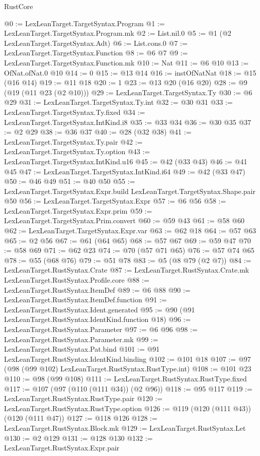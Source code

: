 \begin{lexlean}{RustCore}
\begin{coremodule}
{\begin{coremodule}
{{{{{@0 := LexLeanTarget.TargetSyntax.Program
@1 := LexLeanTarget.TargetSyntax.Program.mk
@2 := List.nil.{0}
@5 := @1 (@2 LexLeanTarget.TargetSyntax.Adt)
@6 := List.cons.{0}
@7 := LexLeanTarget.TargetSyntax.Function
@8 := @6 @7
@9 := LexLeanTarget.TargetSyntax.Function.mk
@10 := Nat
@11 := @6 @10
@13 := OfNat.ofNat.{0} @10
@14 := 0
@15 := @13 @14
@16 := instOfNatNat
@18 := @15 (@16 @14)
@19 := @11 @18
@20 := 1
@23 := @13 @20 (@16 @20)
@28 := @9 (@19 (@11 @23 (@2 @10)))
@29 := LexLeanTarget.TargetSyntax.Ty
@30 := @6 @29
@31 := LexLeanTarget.TargetSyntax.Ty.int
@32 := @30 @31
@33 := LexLeanTarget.TargetSyntax.Ty.fixed
@34 := LexLeanTarget.TargetSyntax.IntKind.i8
@35 := @33 @34
@36 := @30 @35
@37 := @2 @29
@38 := @36 @37
@40 := @28 (@32 @38)
@41 := LexLeanTarget.TargetSyntax.Ty.pair
@42 := LexLeanTarget.TargetSyntax.Ty.option
@43 := LexLeanTarget.TargetSyntax.IntKind.u16
@45 := @42 (@33 @43)
@46 := @41 @45
@47 := LexLeanTarget.TargetSyntax.IntKind.i64
@49 := @42 (@33 @47)
@50 := @46 @49
@51 := @40 @50
@55 := LexLeanTarget.TargetSyntax.Expr.build LexLeanTarget.TargetSyntax.Shape.pair @50
@56 := LexLeanTarget.TargetSyntax.Expr
@57 := @6 @56
@58 := LexLeanTarget.TargetSyntax.Expr.prim
@59 := LexLeanTarget.TargetSyntax.Prim.convert
@60 := @59 @43
@61 := @58 @60
@62 := LexLeanTarget.TargetSyntax.Expr.var
@63 := @62 @18
@64 := @57 @63
@65 := @2 @56
@67 := @61 (@64 @65)
@68 := @57 @67
@69 := @59 @47
@70 := @58 @69
@71 := @62 @23
@74 := @70 (@57 @71 @65)
@76 := @57 @74 @65
@78 := @55 (@68 @76)
@79 := @51 @78
@83 := @5 (@8 @79 (@2 @7))
@84 := LexLeanTarget.RustSyntax.Crate
@87 := LexLeanTarget.RustSyntax.Crate.mk LexLeanTarget.RustSyntax.Profile.core
@88 := LexLeanTarget.RustSyntax.ItemDef
@89 := @6 @88
@90 := LexLeanTarget.RustSyntax.ItemDef.function
@91 := LexLeanTarget.RustSyntax.Ident.generated
@95 := @90 (@91 LexLeanTarget.RustSyntax.IdentKind.function @18)
@96 := LexLeanTarget.RustSyntax.Parameter
@97 := @6 @96
@98 := LexLeanTarget.RustSyntax.Parameter.mk
@99 := LexLeanTarget.RustSyntax.Pat.bind
@101 := @91 LexLeanTarget.RustSyntax.IdentKind.binding
@102 := @101 @18
@107 := @97 (@98 (@99 @102) LexLeanTarget.RustSyntax.RustType.int)
@108 := @101 @23
@110 := @98 (@99 @108)
@111 := LexLeanTarget.RustSyntax.RustType.fixed
@117 := @107 (@97 (@110 (@111 @34)) (@2 @96))
@118 := @95 @117
@119 := LexLeanTarget.RustSyntax.RustType.pair
@120 := LexLeanTarget.RustSyntax.RustType.option
@126 := @119 (@120 (@111 @43)) (@120 (@111 @47))
@127 := @118 @126
@128 := LexLeanTarget.RustSyntax.Block.mk
@129 := LexLeanTarget.RustSyntax.Let
@130 := @2 @129
@131 := @128 @130
@132 := LexLeanTarget.RustSyntax.Expr.pair
}}}}}
\end{coremodule}}
\end{coremodule}
\end{lexlean}

